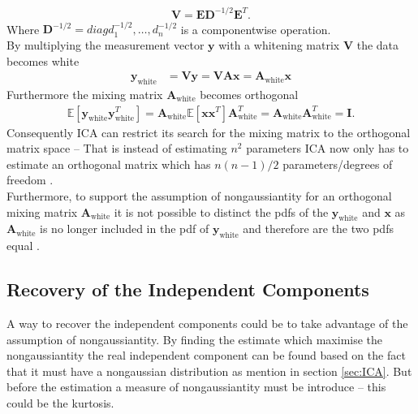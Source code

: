 \begin{align*}
\mathbf{V} = \mathbf{ED}^{-1/2} \mathbf{E}^T.
\end{align*}
Where $\mathbf{D}^{-1/2}=diag{d_1^{-1/2},\hdots,d_n^{-1/2}}$ is a componentwise operation.\\  
By multiplying the measurement vector $\mathbf{y}$ with a whitening matrix $\mathbf{V}$ the data becomes white
\begin{align}
\mathbf{y}_{\text{white}} &= \mathbf{Vy} = \mathbf{VAx} = \mathbf{A}_{\text{white}} \mathbf{x} \nonumber
\end{align}
Furthermore the mixing matrix $\mathbf{A}_{\text{white}}$ becomes orthogonal 
\begin{align*}
 \mathbb{E}[\mathbf{y}_{\text{white}} \mathbf{y}_{\text{white}}^T] = \mathbf{A}_{\text{white}} \mathbb{E}[\mathbf{xx}^T] \mathbf{A}_{\text{white}}^T = \mathbf{A}_{\text{white}} \mathbf{A}_{\text{white}}^T = \mathbf{I}.
 \end{align*} 
Consequently ICA can restrict its search for the mixing matrix to the orthogonal matrix space -- That is instead of estimating $n^2$ parameters ICA now only has to estimate an orthogonal matrix which has $n(n-1)/2$ parameters/degrees of freedom \cite[p. 159]{ICA}.
\\
Furthermore, to support the assumption of nongaussiantity for an orthogonal mixing matrix $\mathbf{A}_{\text{white}}$ it is not possible to distinct the pdfs of the $\mathbf{y}_{\text{white}}$ and $\mathbf{x}$ as $\mathbf{A}_{\text{white}}$ is no longer included in the pdf of $\mathbf{y}_{\text{white}}$ and therefore are the two pdfs equal \cite[p. 161-163]{ICA}.

\subsection{Recovery of the Independent Components}\label{sec:est_ica}
A way to recover the independent components could be to take advantage of the assumption of nongaussiantity. By finding the estimate which maximise the nongaussiantity the real independent component can be found based on the fact that it must have a nongaussian distribution as mention in section \ref{sec:ICA}. But before the estimation a measure of nongaussiantity must be introduce -- this could be the kurtosis.

